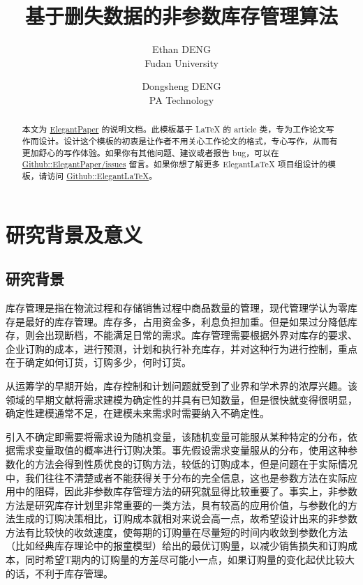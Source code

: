 \documentclass[lang=cn,11pt,a4paper]{elegantpaper}
\title{基于删失数据的非参数库存管理算法}
\author{Ethan DENG \\ Fudan University \and Dongsheng DENG \\ PA Technology}
\institute{\href{https://elegantlatex.org/}{Elegant\LaTeX{} 项目组}}
\date{\zhtoday}
\begin{document}
\maketitle

\begin{abstract}
本文为 \href{https://github.com/ElegantLaTeX/ElegantPaper/}{ElegantPaper} 的说明文档。此模板基于 \LaTeX{} 的 article 类，专为工作论文写作而设计。设计这个模板的初衷是让作者不用关心工作论文的格式，专心写作，从而有更加舒心的写作体验。如果你有其他问题、建议或者报告 bug，可以在 \href{https://github.com/ElegantLaTeX/ElegantPaper/issues}{Github::ElegantPaper/issues} 留言。如果你想了解更多 Elegant\LaTeX{} 项目组设计的模板，请访问 \href{https://github.com/ElegantLaTeX/}{Github::ElegantLaTeX}。
\end{abstract}



\section{研究背景及意义}

\subsection{研究背景}
库存管理是指在物流过程和存储销售过程中商品数量的管理，现代管理学认为零库存是最好的库存管理。库存多，占用资金多，利息负担加重。但是如果过分降低库存，则会出现断档，不能满足日常的需求。库存管理需要根据外界对库存的要求、企业订购的成本，进行预测，计划和执行补充库存，并对这种行为进行控制，重点在于确定如何订货，订购多少，何时订货。

从运筹学的早期开始，库存控制和计划问题就受到了业界和学术界的浓厚兴趣。该领域的早期文献将需求建模为确定性的并具有已知数量，但是很快就变得很明显，确定性建模通常不足，在建模未来需求时需要纳入不确定性。

引入不确定即需要将需求设为随机变量，该随机变量可能服从某种特定的分布，依据需求变量取值的概率进行订购决策。事先假设需求变量服从的分布，使用这种参数化的方法会得到性质优良的订购方法，较低的订购成本，但是问题在于实际情况中，我们往往不清楚或者不能获得关于分布的完全信息，这也是参数方法在实际应用中的阻碍，因此非参数库存管理方法的研究就显得比较重要了。事实上，非参数方法是研究库存计划里非常重要的一类方法，具有较高的应用价值，与参数化的方法生成的订购决策相比，订购成本就相对来说会高一点，故希望设计出来的非参数方法有比较快的收敛速度，使每期的订购量在尽量短的时间内收敛到参数化方法（比如经典库存理论中的报童模型）给出的最优订购量，以减少销售损失和订购成本，同时希望T期内的订购量的方差尽可能小一点，如果订购量的变化起伏比较大的话，不利于库存管理。
\end{document}
